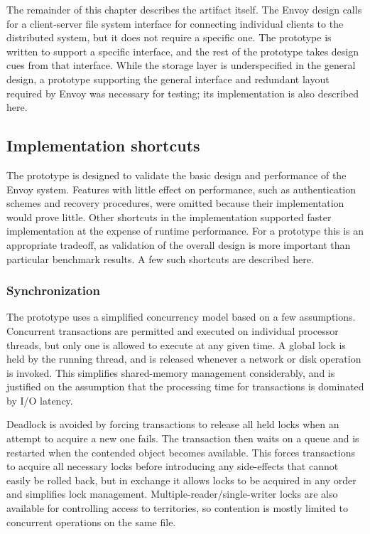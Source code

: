 The remainder of this chapter describes the artifact itself. The Envoy design calls for a client-server file system interface for connecting individual clients to the distributed system, but it does not require a specific one. The prototype is written to support a specific interface, and the rest of the prototype takes design cues from that interface. While the storage layer is underspecified in the general design, a prototype supporting the general interface and redundant layout required by Envoy was necessary for testing; its implementation is also described here.

\subsection{Implementation shortcuts}

The prototype is designed to validate the basic design and performance of the Envoy system. Features with little effect on performance, such as authentication schemes and recovery procedures, were omitted because their implementation would prove little. Other shortcuts in the implementation supported faster implementation at the expense of runtime performance. For a prototype this is an appropriate tradeoff, as validation of the overall design is more important than particular benchmark results. A few such shortcuts are described here.

\subsubsection{Synchronization}

The prototype uses a simplified concurrency model based on a few assumptions. Concurrent transactions are permitted and executed on individual processor threads, but only one is allowed to execute at any given time. A global lock is held by the running thread, and is released whenever a network or disk operation is invoked. This simplifies shared-memory management considerably, and is justified on the assumption that the processing time for transactions is dominated by I/O latency.

Deadlock is avoided by forcing transactions to release all held locks when an attempt to acquire a new one fails. The transaction then waits on a queue and is restarted when the contended object becomes available. This forces transactions to acquire all necessary locks before introducing any side-effects that cannot easily be rolled back, but in exchange it allows locks to be acquired in any order and simplifies lock management. Multiple-reader/single-writer locks are also available for controlling access to territories, so contention is mostly limited to concurrent operations on the same file.

